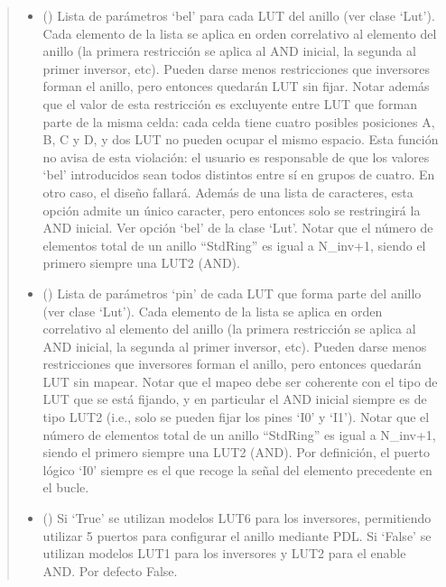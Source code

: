 \documentclass[letterpaper,10pt,english]{sphinxmanual}
\begin{document}
\begin{fulllineitems}
\begin{quote}
\begin{description}
\begin{itemize}
\item {} 
\sphinxAtStartPar
{} () \textendash{} Lista de parámetros ‘bel’ para cada LUT del anillo (ver clase ‘Lut’). Cada elemento de la lista se aplica en orden correlativo al elemento del anillo (la primera restricción se aplica al AND inicial, la segunda al primer inversor, etc). Pueden darse menos restricciones que inversores forman el anillo, pero entonces quedarán LUT sin fijar. Notar además que el valor de esta restricción es excluyente entre LUT que forman parte de la misma celda: cada celda tiene cuatro posibles posiciones A, B, C y D, y dos LUT no pueden ocupar el mismo espacio. Esta función no avisa de esta violación: el usuario es responsable de que los valores ‘bel’ introducidos sean todos distintos entre sí en grupos de cuatro. En otro caso, el diseño fallará. Además de una lista de caracteres, esta opción admite un único caracter, pero entonces solo se restringirá la AND inicial. Ver opción ‘bel’ de la clase ‘Lut’. Notar que el número de elementos total de un anillo “StdRing” es igual a N\_inv+1, siendo el primero siempre una LUT2 (AND).

\item {} 
\sphinxAtStartPar
{} () \textendash{} Lista de parámetros ‘pin’ de cada LUT que forma parte del anillo (ver clase ‘Lut’). Cada elemento de la lista se aplica en orden correlativo al elemento del anillo (la primera restricción se aplica al AND inicial, la segunda al primer inversor, etc). Pueden darse menos restricciones que inversores forman el anillo, pero entonces quedarán LUT sin mapear. Notar que el mapeo debe ser coherente con el tipo de LUT que se está fijando, y en particular el AND inicial siempre es de tipo LUT2 (i.e., solo se pueden fijar los pines ‘I0’ y ‘I1’). Notar que el número de elementos total de un anillo “StdRing” es igual a N\_inv+1, siendo el primero siempre una LUT2 (AND). Por definición, el puerto lógico ‘I0’ siempre es el que recoge la señal del elemento precedente en el bucle.

\item {} 
\sphinxAtStartPar
{} (\sphinxstyleliteralemphasis{\sphinxupquote{, }}) \textendash{} Si ‘True’ se utilizan modelos LUT6 para los inversores, permitiendo utilizar 5 puertos para configurar el anillo mediante PDL. Si ‘False’ se utilizan modelos LUT1 para los inversores y LUT2 para el enable AND. Por defecto False.


\end{itemize}
\end{description}
\end{quote}
\end{fulllineitems}
\end{document}
